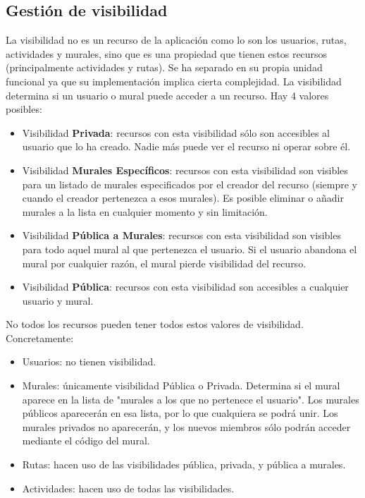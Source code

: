\subsection{Gestión de visibilidad}
La visibilidad no es un recurso de la aplicación como lo son los usuarios, rutas, actividades y murales, sino que es una propiedad que tienen estos recursos (principalmente actividades y rutas). Se ha separado en su propia unidad funcional ya que su implementación implica cierta complejidad. La visibilidad determina si un usuario o mural puede acceder a un recurso. Hay 4 valores posibles: 
\begin{itemize}
    \item Visibilidad \textbf{Privada}: recursos con esta visibilidad sólo son accesibles al usuario que lo ha creado. Nadie más puede ver el recurso ni operar sobre él.
    \item Visibilidad \textbf{Murales Específicos}: recursos con esta visibilidad son visibles para un listado de murales especificados por el creador del recurso (siempre y cuando el creador pertenezca a esos murales). Es posible eliminar o añadir murales a la lista en cualquier momento y sin limitación.
    \item Visibilidad \textbf{Pública a Murales}: recursos con esta visibilidad son visibles para todo aquel mural al que pertenezca el usuario. Si el usuario abandona el mural por cualquier razón, el mural pierde visibilidad del recurso.
    \item Visibilidad \textbf{Pública}: recursos con esta visibilidad son accesibles a cualquier usuario y mural.
\end{itemize}

No todos los recursos pueden tener todos estos valores de visibilidad. Concretamente:
\begin{itemize}
    \item Usuarios: no tienen visibilidad.
    \item Murales: únicamente visibilidad Pública o Privada. Determina si el mural aparece en la lista de "murales a los que no pertenece el usuario". Los murales públicos aparecerán en esa lista, por lo que cualquiera se podrá unir. Los murales privados no aparecerán, y los nuevos miembros sólo podrán acceder mediante el código del mural.
    \item Rutas: hacen uso de las visibilidades pública, privada, y pública a murales.
    \item Actividades: hacen uso de todas las visibilidades.
\end{itemize}

